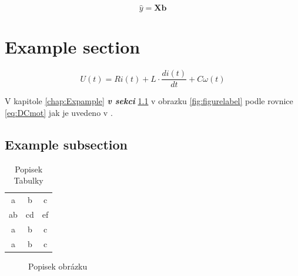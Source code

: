 \begin{equation}\label{eq:LS_model}
\hat{y} = \bm{X} \bm{b}
\end{equation}

\section{Example section}
\label{sec:Example-section}

\begin{equation}\label{eq:DCmot2}
U(t) = Ri(t) + L\cdot\frac{di(t)}{dt} + C\omega(t)
\end{equation}


V kapitole \ref{chap:Expample} \textbf{\textit{v sekci}} \ref{sec:Example-subsection} v obrazku \ref{fig:figurelabel} podle rovnice \ref{eq:DCmot} jak je uvedeno v \cite{Blaha}.




\subsection{Example subsection}
\label{sec:Example-subsection}
\lipsum[6]
\lipsum[7]


\begin{table}[!h] %
	\begin{center}
		\begin{tabular}{ccc}
			a	& b & c \\ 
			ab	& cd & ef \\ 
			a	& b &  c\\ 
			a	& b &  c

		\end{tabular}
	\end{center}
	\caption[Kratky popisek tabulky]{Popisek Tabulky \cite{Atkeson1996}}
	\label{tab:car4Param}
\end{table}


\lipsum

\begin{figure}[!ht] 
	\begin{center}
	\end{center}
	\caption[Kratky popisek]{Popisek obrázku}
	\label{fig:LLM_init}
\end{figure}

